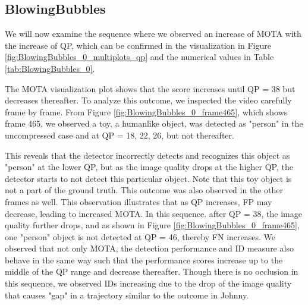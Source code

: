 \subsection{BlowingBubbles}
We will now examine the sequence where we observed an increase of MOTA with the increase of QP, which can be confirmed in the visualization in Figure \ref{fig:BlowingBubbles_0_multiplots_qp} and the numerical values in Table \ref{tab:BlowingBubbles_0}.


The MOTA visualization plot shows that the score increases until QP = 38 but decreases thereafter. To analyze this outcome, we inspected the video carefully frame by frame. From Figure \ref{fig:BlowingBubbles_0_frame465}, which shows frame 465, we observed a toy, a humanlike object, was detected as "person" in the uncompressed case and at QP = 18, 22, 26, but not thereafter.

This reveals that the detector incorrectly detects and recognizes this object as "person" at the lower QP, but as the image quality drops at the higher QP, the detector starts to not detect this particular object. Note that this toy object is not a part of the ground truth. This outcome was also observed in the other frames as well. This observation illustrates that as QP increases, FP may decrease, leading to increased MOTA. In this sequence. after QP = 38, the image quality further drops, and as shown in Figure \ref{fig:BlowingBubbles_0_frame465}, one "person" object is not detected at QP = 46, thereby FN increases. We observed that not only MOTA, the detection performance and ID measure also behave in the same way such that the performance scores increase up to the middle of the QP range and decrease thereafter. Though there is no occlusion in this sequence, we observed IDs increasing due to the drop of the image quality that causes "gap" in a trajectory similar to the outcome in Johnny.



